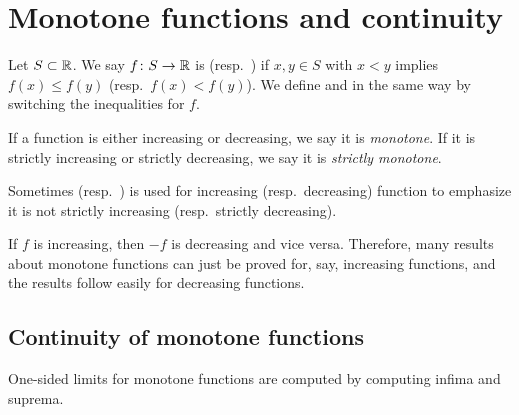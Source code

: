 
\sectionnewpage
\section{Monotone functions and continuity}
\label{sec:monotonefunc}


\begin{defn}
Let $S \subset {\mathbb{R}}$.
We say $f \colon S \to {\mathbb{R}}$ is \emph{}
(resp.\  \emph{}) if $x,y \in S$ with
$x < y$ implies $f(x) \leq f(y)$ (resp.\ $f(x) < f(y)$).
We define
\emph{} and
\emph{} in the same way by switching the
inequalities for $f$.

If a function is either increasing or decreasing, we say it is
\emph{monotone}.  If it is
strictly increasing or strictly decreasing, we say it is
\emph{strictly monotone}.
\end{defn}

Sometimes \emph{}
(resp.\ \emph{}) is used
for increasing (resp.\ decreasing) function to emphasize it is not
strictly increasing (resp.\ strictly decreasing).

If $f$ is increasing, then $-f$ is decreasing and vice versa.  Therefore,
many results about monotone functions can just be proved for, say, increasing
functions, and the results follow easily for decreasing functions.

\subsection{Continuity of monotone functions}

One-sided limits for monotone functions are computed
by computing infima and suprema.


